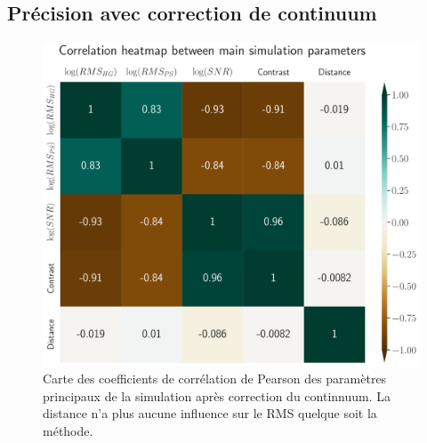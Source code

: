 \documentclass[../main/main.tex]{subfiles}
\begin{document}
\clearpage
\subsection{Précision avec correction de continuum}


\begin{figure}[ht]
  \begin{minipage}[c]{0.6\textwidth}
    \includegraphics[width=\textwidth]{../figures/08_simu/corrheatmap_simu_params.pdf}
  \end{minipage}\hfill
  \begin{minipage}[c]{0.38\textwidth}
    \caption[Corrélation des paramètres de la
    simulation (continuum corrigé).]{Carte des coefficients de corrélation de Pearson des
      paramètres principaux de la
    simulation après correction du continnuum. La distance n'a plus
    aucune influence sur le RMS quelque soit la méthode.}\label{fig:corrheatmap_simuparams}
  \end{minipage}
\end{figure}


\begin{figure}[ht]
  \centering
  \caption[]{}
  \label{fig:continuumcorrection_ex}
\end{figure}
\end{document}
